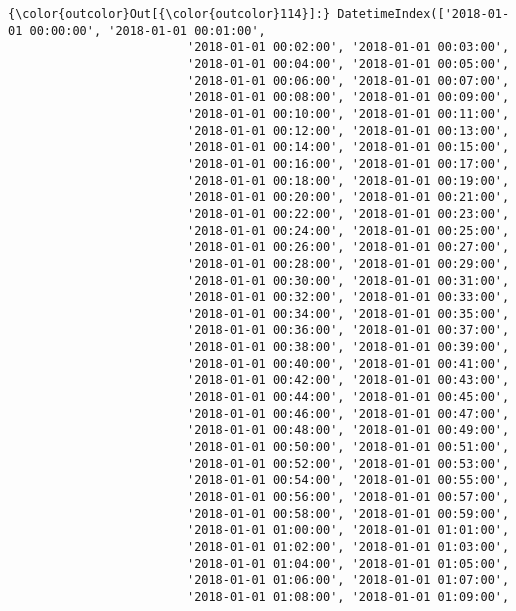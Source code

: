 \documentclass[11pt]{article}
\begin{document}
\begin{Verbatim}[commandchars=\\\{\}]
{\color{outcolor}Out[{\color{outcolor}114}]:} DatetimeIndex(['2018-01-01 00:00:00', '2018-01-01 00:01:00',
                         '2018-01-01 00:02:00', '2018-01-01 00:03:00',
                         '2018-01-01 00:04:00', '2018-01-01 00:05:00',
                         '2018-01-01 00:06:00', '2018-01-01 00:07:00',
                         '2018-01-01 00:08:00', '2018-01-01 00:09:00',
                         '2018-01-01 00:10:00', '2018-01-01 00:11:00',
                         '2018-01-01 00:12:00', '2018-01-01 00:13:00',
                         '2018-01-01 00:14:00', '2018-01-01 00:15:00',
                         '2018-01-01 00:16:00', '2018-01-01 00:17:00',
                         '2018-01-01 00:18:00', '2018-01-01 00:19:00',
                         '2018-01-01 00:20:00', '2018-01-01 00:21:00',
                         '2018-01-01 00:22:00', '2018-01-01 00:23:00',
                         '2018-01-01 00:24:00', '2018-01-01 00:25:00',
                         '2018-01-01 00:26:00', '2018-01-01 00:27:00',
                         '2018-01-01 00:28:00', '2018-01-01 00:29:00',
                         '2018-01-01 00:30:00', '2018-01-01 00:31:00',
                         '2018-01-01 00:32:00', '2018-01-01 00:33:00',
                         '2018-01-01 00:34:00', '2018-01-01 00:35:00',
                         '2018-01-01 00:36:00', '2018-01-01 00:37:00',
                         '2018-01-01 00:38:00', '2018-01-01 00:39:00',
                         '2018-01-01 00:40:00', '2018-01-01 00:41:00',
                         '2018-01-01 00:42:00', '2018-01-01 00:43:00',
                         '2018-01-01 00:44:00', '2018-01-01 00:45:00',
                         '2018-01-01 00:46:00', '2018-01-01 00:47:00',
                         '2018-01-01 00:48:00', '2018-01-01 00:49:00',
                         '2018-01-01 00:50:00', '2018-01-01 00:51:00',
                         '2018-01-01 00:52:00', '2018-01-01 00:53:00',
                         '2018-01-01 00:54:00', '2018-01-01 00:55:00',
                         '2018-01-01 00:56:00', '2018-01-01 00:57:00',
                         '2018-01-01 00:58:00', '2018-01-01 00:59:00',
                         '2018-01-01 01:00:00', '2018-01-01 01:01:00',
                         '2018-01-01 01:02:00', '2018-01-01 01:03:00',
                         '2018-01-01 01:04:00', '2018-01-01 01:05:00',
                         '2018-01-01 01:06:00', '2018-01-01 01:07:00',
                         '2018-01-01 01:08:00', '2018-01-01 01:09:00',

\end{Verbatim}
\end{document}
